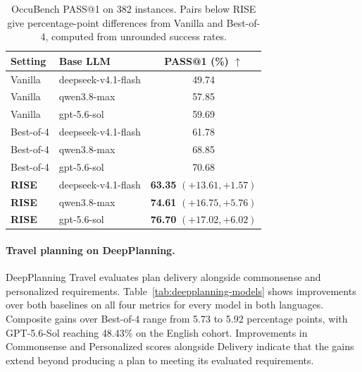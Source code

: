 \documentclass{article}
\begin{document}
\begin{table}[!htb]
\centering
\scriptsize
\setlength{\tabcolsep}{2.5pt}
\renewcommand{\arraystretch}{1.12}
\caption{OccuBench PASS@1 on 382 instances. Pairs below RISE give percentage-point differences from Vanilla and Best-of-4, computed from unrounded success rates.}
\label{tab:occubench-models}
\begin{tabular*}{\linewidth}{@{\extracolsep{\fill}}llc@{}}
\toprule
Setting & Base LLM & PASS@1 (\%) $\uparrow$ \\
\midrule
Vanilla & deepseek-v4.1-flash & 49.74 \\
Vanilla & qwen3.8-max & 57.85 \\
Vanilla & gpt-5.6-sol & 59.69 \\
\midrule
Best-of-4 & deepseek-v4.1-flash & 61.78 \\
Best-of-4 & qwen3.8-max & 68.85 \\
Best-of-4 & gpt-5.6-sol & 70.68 \\
\midrule
\textbf{RISE} & deepseek-v4.1-flash & \shortstack[c]{\textbf{63.35}\\[-1pt]{\scriptsize $(+13.61,+1.57)$}} \\
\textbf{RISE} & qwen3.8-max & \shortstack[c]{\textbf{74.61}\\[-1pt]{\scriptsize $(+16.75,+5.76)$}} \\
\textbf{RISE} & gpt-5.6-sol & \shortstack[c]{\textbf{76.70}\\[-1pt]{\scriptsize $(+17.02,+6.02)$}} \\
\bottomrule
\end{tabular*}
\end{table}
\paragraph{Travel planning on DeepPlanning.} DeepPlanning Travel evaluates plan delivery alongside commonsense and personalized requirements. Table~\ref{tab:deepplanning-models} shows improvements over both baselines on all four metrics for every model in both languages. Composite gains over Best-of-4 range from 5.73 to 5.92 percentage points, with GPT-5.6-Sol reaching 48.43\% on the English cohort. Improvements in Commonsense and Personalized scores alongside Delivery indicate that the gains extend beyond producing a plan to meeting its evaluated requirements.
\end{document}
